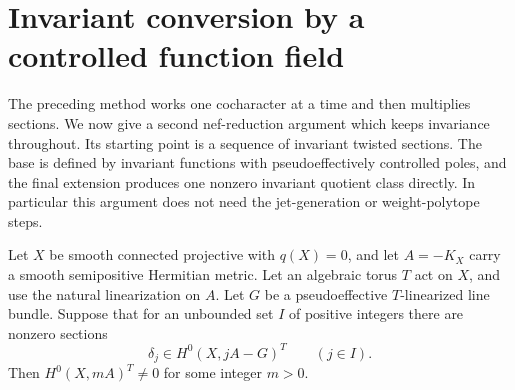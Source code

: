 \section{Invariant conversion by a controlled function field}
\label{V:sec-invariant-field}

The preceding method works one cocharacter at a time and then multiplies
sections.  We now give a second nef-reduction argument which keeps
invariance throughout.  Its starting point is a sequence of invariant
twisted sections.  The base is defined by invariant functions with
pseudoeffectively controlled poles, and the final extension produces
one nonzero invariant quotient class directly.  In particular this
argument does not need the jet-generation or weight-polytope steps.

\begin{theorem}\label{V:invariant-conversion}
Let $X$ be smooth connected projective with $q(X)=0$, and let
$A=-K_X$ carry a smooth semipositive Hermitian metric.  Let an
algebraic torus $T$ act on $X$, and use the natural linearization on
$A$.  Let $G$ be a pseudoeffective $T$-linearized line bundle.
Suppose that for an unbounded set $I$ of positive integers there are
nonzero sections
\[
 \delta_j\in H^0(X,jA-G)^T\qquad(j\in I).
\]
Then $H^0(X,mA)^T\ne0$ for some integer $m>0$.
\end{theorem}


